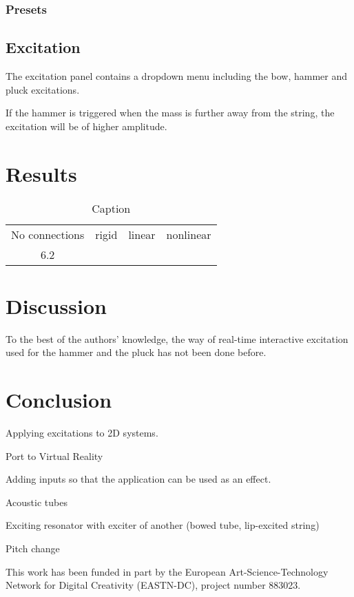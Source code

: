 \documentclass{article}
\begin{document}
\subsubsection{Presets}

\subsection{Excitation}
The excitation panel contains a dropdown menu including the bow, hammer and pluck excitations.

If the hammer is triggered when the mass is further away from the string, the excitation will be of higher amplitude.


\section{Results}

\begin{table}[]
    \centering
    \begin{tabular}{c|c|c|c}
        No connections & rigid & linear & nonlinear \\
        6.2 & 
    \end{tabular}
    \caption{Caption}
    \label{tab:my_label}
\end{table}

\section{Discussion}
To the best of the authors' knowledge, the way of real-time interactive excitation used for the hammer and the pluck has not been done before. 

\section{Conclusion}

Applying excitations to 2D systems.

Port to Virtual Reality

Adding inputs so that the application can be used as an effect. 

Acoustic tubes

Exciting resonator with exciter of another (bowed tube, lip-excited string)

Pitch change


\begin{acknowledgments}
This work has been funded in part by the European Art-Science-Technology Network for Digital Creativity (EASTN-DC), project number 883023.
\end{acknowledgments} 


\end{document}
